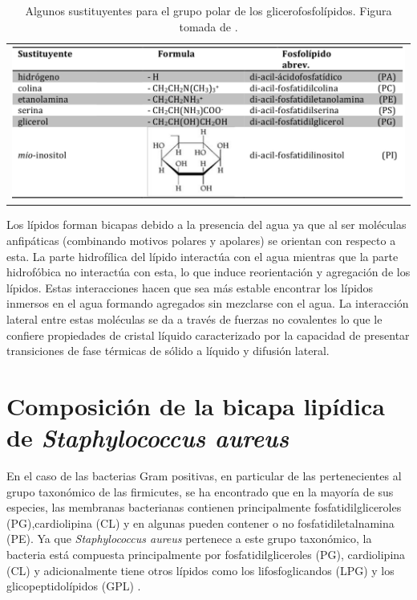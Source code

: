 \begin{table}[]
    \centering
    \begin{tabular}{c}
  \includegraphics[scale=0.4]{Kap2/headgroups.png}
    \end{tabular}
    \caption{Algunos sustituyentes para el grupo polar de los glicerofosfol\'{i}pidos. Figura tomada de \cite{Bagatolli2017VidaGrasas}.}
    \label{tab:polar}
\end{table}

Los l\'{i}pidos forman bicapas debido a la presencia del agua ya que al ser mol\'{e}culas anfip\'{a}ticas (combinando motivos polares y apolares) se orientan con respecto a esta. La parte hidrof\'{i}lica del l\'{i}pido interact\'{u}a con el agua mientras que la parte hidrof\'{o}bica no interact\'{u}a con esta, lo que induce reorientaci\'{o}n y agregaci\'{o}n de los l\'{i}pidos. Estas interacciones hacen que sea m\'{a}s estable encontrar los l\'{i}pidos inmersos en el agua formando agregados sin mezclarse con el agua. La interacci\'on lateral entre estas mol\'eculas se da a trav\'es de fuerzas no covalentes lo que le confiere propiedades de cristal l\'iquido caracterizado por la capacidad de presentar transiciones de fase t\'{e}rmicas de s\'olido a l\'iquido y difusi\'{o}n lateral. \\
\section{Composici\'{o}n de la bicapa lip\'{i}dica de \textit{Staphylococcus aureus}}
En el caso de las bacterias Gram positivas, en particular de las pertenecientes al grupo taxon\'{o}mico de las firmicutes, se ha encontrado que en la mayor\'{i}a de sus especies, las membranas bacterianas contienen principalmente fosfatidilgliceroles (PG),cardiolipina (CL) y en algunas pueden contener o no fosfatidiletalnamina (PE). Ya que \textit{Staphylococcus aureus} pertenece a este grupo taxon\'{o}mico, la bacteria est\'{a} compuesta principalmente por fosfatidilgliceroles (PG), cardiolipina (CL) y adicionalmente tiene otros l\'{i}pidos como los lifosfoglicandos (LPG) y los glicopeptidol\'{i}pidos (GPL) \cite{Sohlenkamp2015BacterialPathways}. \\

